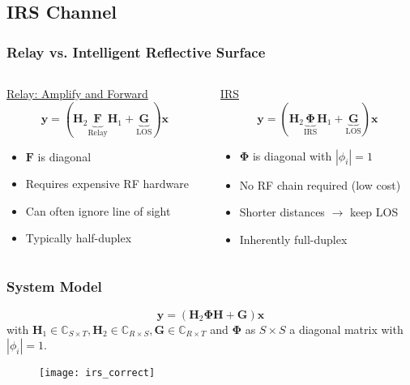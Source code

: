 \documentclass[10pt,tgadventor, onlymath]{beamer}
\begin{document}
\subsection{IRS Channel}
\begin{frame}
\frametitle{Relay vs. Intelligent Reflective Surface}
\begin{columns}
\begin{column}{0.5\linewidth}
\centering 
	\underline{Relay: Amplify and Forward}
	\\
	\begin{equation*}
	\mathbf{y} = (\mathbf{H}_2\underbrace{\mathbf{F}}_{\text{Relay}}\mathbf{H}_1 + \underbrace{\mathbf{G}}_{\text{LOS}})\mathbf{x}
	\end{equation*}
	
	\begin{itemize}
	\item 
		$\mathbf{F}$ is diagonal
	\item 
		Requires expensive RF hardware
	\item 
		Can often ignore line of sight
	\item 
		Typically half-duplex
	\end{itemize}
\end{column}
\begin{column}{0.5\linewidth}
\centering 

	\underline{IRS}
	\\
	\begin{equation*}
	\mathbf{y} = (\mathbf{H}_2\underbrace{\boldsymbol{\Phi}}_{\text{IRS}}\mathbf{H}_1 + \underbrace{\mathbf{G}}_{\text{LOS}})\mathbf{x}
	\end{equation*} 
	\begin{itemize}
	\item 
		$\boldsymbol{\Phi}$ is diagonal with $| \phi_i | =1$
	\item 
		No RF chain required (low cost)
	\item
		Shorter distances $\rightarrow$ keep LOS
	\item 
		Inherently full-duplex
	\end{itemize}
\end{column}
\end{columns}

\end{frame}




\begin{frame}
\frametitle{System Model}
\centering
\begin{equation*}
	\mathbf{y} = (\mathbf{H}_2\boldsymbol{\Phi}\mathbf{H}+ \mathbf{G})\mathbf{x}
\end{equation*}
with 
$\mathbf{H}_{1}\in \mathbb{C}_{S \times T},\mathbf{H}_{2} \in \mathbb{C}_{R \times S}, \mathbf{G} \in \mathbb{C}_{R \times T}$ and $\boldsymbol{\Phi}$ as $S \times S$ a diagonal matrix with $| \phi_i | =1$.

	\begin{figure}
		\centering
		\texttt{[image: irs\_correct]}
	\end{figure}
\end{frame}
\end{document}
